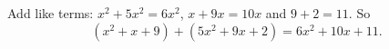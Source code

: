 Add like terms: $x^2+5x^2=6x^2$, $x+9x=10x$ and $9+2=11$. So
\[
(x^2+x+9)+(5x^2+9x+2)=\boxed{6x^2+10x+11}.
\]
